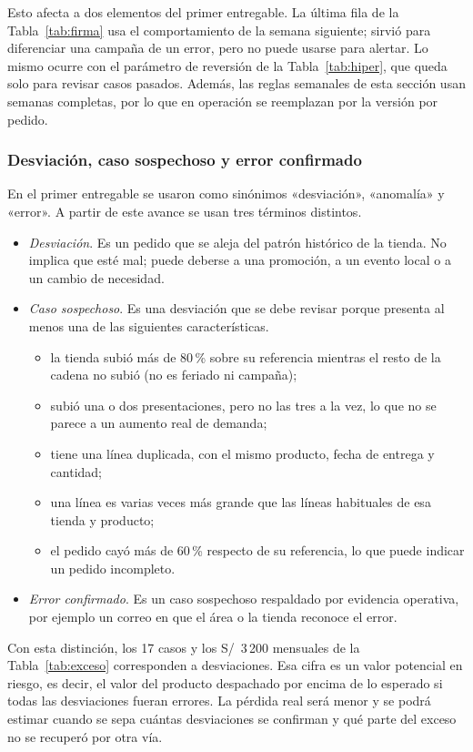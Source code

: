 Esto afecta a dos elementos del primer entregable. La última fila de la Tabla~\ref{tab:firma} usa el comportamiento de la semana siguiente; sirvió para diferenciar una campaña de un error, pero no puede usarse para alertar. Lo mismo ocurre con el parámetro de reversión de la Tabla~\ref{tab:hiper}, que queda solo para revisar casos pasados. Además, las reglas semanales de esta sección usan semanas completas, por lo que en operación se reemplazan por la versión por pedido.

\subsubsection{Desviación, caso sospechoso y error confirmado}
\label{sec:av-terminos}

En el primer entregable se usaron como sinónimos «desviación», «anomalía» y «error». A partir de este avance se usan tres términos distintos.

\begin{itemize}
\item \emph{Desviación}. Es un pedido que se aleja del patrón histórico de la tienda. No implica que esté mal; puede deberse a una promoción, a un evento local o a un cambio de necesidad.
\item \emph{Caso sospechoso}. Es una desviación que se debe revisar porque presenta al menos una de las siguientes características.
\begin{itemize}
\item la tienda subió más de 80\,\% sobre su referencia mientras el resto de la cadena no subió (no es feriado ni campaña);
\item subió una o dos presentaciones, pero no las tres a la vez, lo que no se parece a un aumento real de demanda;
\item tiene una línea duplicada, con el mismo producto, fecha de entrega y cantidad;
\item una línea es varias veces más grande que las líneas habituales de esa tienda y producto;
\item el pedido cayó más de 60\,\% respecto de su referencia, lo que puede indicar un pedido incompleto.
\end{itemize}
\item \emph{Error confirmado}. Es un caso sospechoso respaldado por evidencia operativa, por ejemplo un correo en que el área o la tienda reconoce el error.
\end{itemize}

Con esta distinción, los 17 casos y los S/~3\,200 mensuales de la Tabla~\ref{tab:exceso} corresponden a desviaciones. Esa cifra es un valor potencial en riesgo, es decir, el valor del producto despachado por encima de lo esperado si todas las desviaciones fueran errores. La pérdida real será menor y se podrá estimar cuando se sepa cuántas desviaciones se confirman y qué parte del exceso no se recuperó por otra vía.


